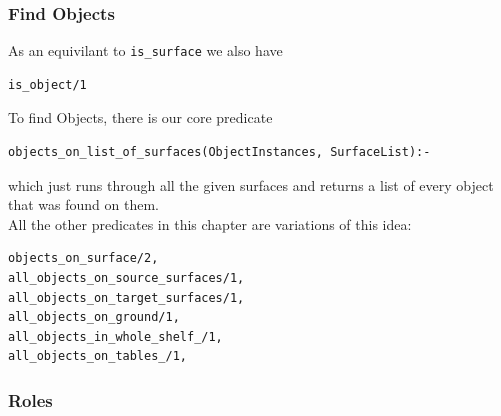 \documentclass[main.tex]{subfiles}
\begin{document}
\subsubsection{Find Objects}
As an equivilant to \texttt{is\_surface} we also have
\begin{lstlisting}
is_object/1
\end{lstlisting}
To find Objects, there is our core predicate
\begin{lstlisting}
objects_on_list_of_surfaces(ObjectInstances, SurfaceList):-
\end{lstlisting}
which just runs through all the given surfaces and returns a list of every object that was found on them.\\
All the other predicates in this chapter are variations of this idea:
\begin{lstlisting}
objects_on_surface/2,
all_objects_on_source_surfaces/1,
all_objects_on_target_surfaces/1,
all_objects_on_ground/1,
all_objects_in_whole_shelf_/1,
all_objects_on_tables_/1,
\end{lstlisting}

\subsubsection{Roles}
\end{document}
